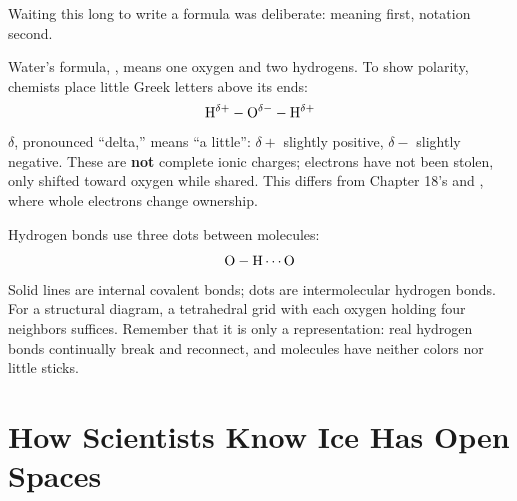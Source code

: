 Waiting this long to write a formula was deliberate: meaning first, notation second.

Water's formula, , means one oxygen and two hydrogens. To show polarity, chemists place little Greek letters above its ends:
\[\mathrm{H^{\delta+}-O^{\delta-}-H^{\delta+}}\]
$\delta$, pronounced ``delta,'' means ``a little'': $\delta+$ slightly positive, $\delta-$ slightly negative. These are \textbf{not} complete ionic charges; electrons have not been stolen, only shifted toward oxygen while shared. This differs from Chapter 18's  and , where whole electrons change ownership.

Hydrogen bonds use three dots between molecules:
\[\mathrm{O-H\cdots O}\]
Solid lines are internal covalent bonds; dots are intermolecular hydrogen bonds. For a structural diagram, a tetrahedral grid with each oxygen holding four neighbors suffices. Remember that it is only a representation: real hydrogen bonds continually break and reconnect, and molecules have neither colors nor little sticks.

\section{How Scientists Know Ice Has Open Spaces}

